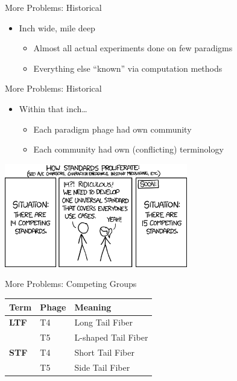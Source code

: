 \documentclass[12pt]{beamer}
\begin{document}
\begin{frame}{More Problems: Historical}
    \begin{itemize}
        \item Inch wide, mile deep
        \begin{itemize}
            \item Almost all actual experiments done on few paradigms
            \item Everything else ``known'' via computation methods
        \end{itemize}
    \end{itemize}
\end{frame}

\begin{frame}{More Problems: Historical}
    \begin{itemize}
        \item Within that inch\ldots
        \begin{itemize}
            \item Each paradigm phage had own community
            \item Each community had own (conflicting) terminology
        \end{itemize}
    \end{itemize}
    \centering
    \includegraphics[width=0.6\textwidth]{./standards.png}
\end{frame}

\begin{frame}{More Problems: Competing Groups}
    \begin{table}
        \begin{tabular}{lll}
            Term         & Phage & Meaning\\\hline
            \textbf{LTF} & T4    & Long Tail Fiber\\
                         & T5    & L-shaped Tail Fiber\\
            \textbf{STF} & T4    & Short Tail Fiber \\
                         & T5    & Side Tail Fiber\\
        \end{tabular}
    \end{table}
\end{frame}
\end{document}
